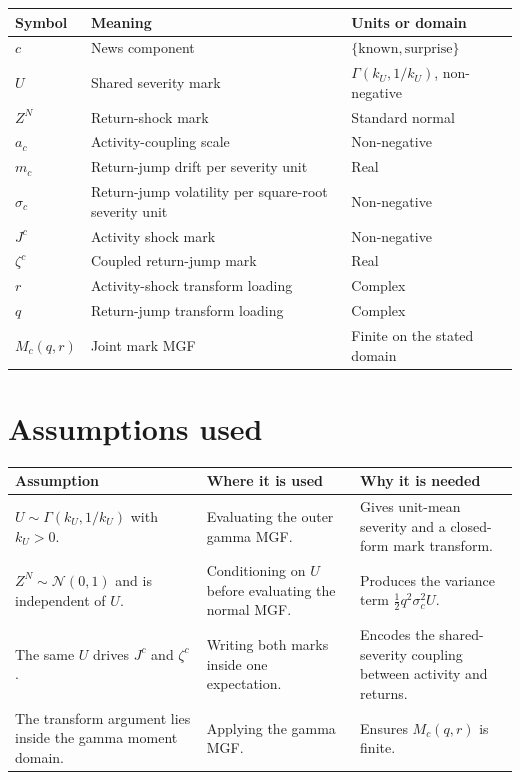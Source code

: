 \documentclass[11pt]{article}
\begin{document}
\begin{tabularx}{\textwidth}{lXX}
\toprule
Symbol & Meaning & Units or domain\\
\midrule
\(c\) & News component & \(\{\mathrm{known},\mathrm{surprise}\}\)\\
\(U\) & Shared severity mark & \(\Gamma(k_U,1/k_U)\), non-negative\\
\(Z^N\) & Return-shock mark & Standard normal\\
\(a_c\) & Activity-coupling scale & Non-negative\\
\(m_c\) & Return-jump drift per severity unit & Real\\
\(\sigma_c\) & Return-jump volatility per square-root severity unit & Non-negative\\
\(J^c\) & Activity shock mark & Non-negative\\
\(\zeta^c\) & Coupled return-jump mark & Real\\
\(r\) & Activity-shock transform loading & Complex\\
\(q\) & Return-jump transform loading & Complex\\
\(M_c(q,r)\) & Joint mark MGF & Finite on the stated domain\\
\bottomrule
\end{tabularx}

\section{Assumptions used}

\begin{tabularx}{\textwidth}{XXX}
\toprule
Assumption & Where it is used & Why it is needed\\
\midrule
\(U\sim\Gamma(k_U,1/k_U)\) with \(k_U>0\).
& Evaluating the outer gamma MGF.
& Gives unit-mean severity and a closed-form mark transform.\\
\(Z^N\sim\mathcal N(0,1)\) and is independent of \(U\).
& Conditioning on \(U\) before evaluating the normal MGF.
& Produces the variance term \(\frac12 q^2\sigma_c^2 U\).\\
The same \(U\) drives \(J^c\) and \(\zeta^c\).
& Writing both marks inside one expectation.
& Encodes the shared-severity coupling between activity and returns.\\
The transform argument lies inside the gamma moment domain.
& Applying the gamma MGF.
& Ensures \(M_c(q,r)\) is finite.\\
\bottomrule
\end{tabularx}
\end{document}

